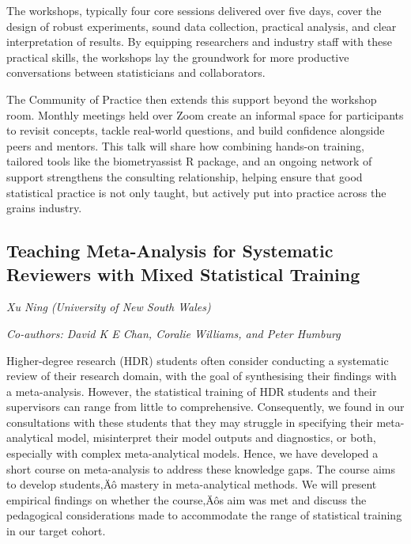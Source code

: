 \documentclass[
]{scrreprt}
\begin{document}
The workshops, typically four core sessions delivered over five days,
cover the design of robust experiments, sound data collection, practical
analysis, and clear interpretation of results. By equipping researchers
and industry staff with these practical skills, the workshops lay the
groundwork for more productive conversations between statisticians and
collaborators.

The Community of Practice then extends this support beyond the workshop
room. Monthly meetings held over Zoom create an informal space for
participants to revisit concepts, tackle real-world questions, and build
confidence alongside peers and mentors. This talk will share how
combining hands-on training, tailored tools like the biometryassist R
package, and an ongoing network of support strengthens the consulting
relationship, helping ensure that good statistical practice is not only
taught, but actively put into practice across the grains industry.

\subsection{Teaching Meta-Analysis for Systematic Reviewers with Mixed
Statistical
Training}\label{teaching-meta-analysis-for-systematic-reviewers-with-mixed-statistical-training}

\emph{Xu Ning} \emph{(University of New South Wales)}

\emph{Co-authors: David K E Chan, Coralie Williams, and Peter Humburg}

\setlength{\parskip}{0.5em}

Higher-degree research (HDR) students often consider conducting a
systematic review of their research domain, with the goal of
synthesising their findings with a meta-analysis. However, the
statistical training of HDR students and their supervisors can range
from little to comprehensive. Consequently, we found in our
consultations with these students that they may struggle in specifying
their meta-analytical model, misinterpret their model outputs and
diagnostics, or both, especially with complex meta-analytical models.
Hence, we have developed a short course on meta-analysis to address
these knowledge gaps. The course aims to develop students‚Äô mastery in
meta-analytical methods. We will present empirical findings on whether
the course‚Äôs aim was met and discuss the pedagogical considerations
made to accommodate the range of statistical training in our target
cohort.
\end{document}
